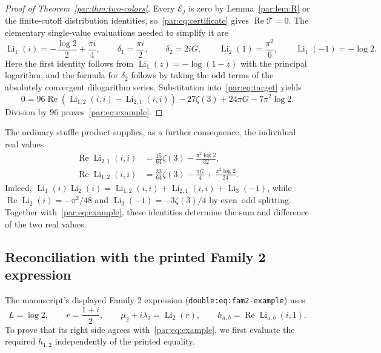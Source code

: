 \documentclass[11pt,a4paper]{article}
\numberwithin{equation}{section}
\theoremstyle{definition}
\theoremstyle{remark}
\DeclareMathOperator{\Li}{Li}
\newcommand{\src}[1]{\nolinkurl{#1}}
\begin{document}
\begin{proof}[Proof of Theorem~\ref{par:thm:two-colors}]
Every $\mathcal E_j$ is zero by Lemma~\ref{par:lem:R} or the finite-cutoff
distribution identities, so~\eqref{par:eq:certificate} gives
$\operatorname{Re}\mathcal T=0$.
The elementary single-value evaluations needed to simplify it are
\[
 \Li_1(i)=-\frac{\log2}{2}+\frac{\pi i}{4},\qquad
 \delta_1=\frac{\pi i}{2},\qquad
 \delta_2=2iG,\qquad
 \Li_2(1)=\frac{\pi^2}{6},\qquad
 \Li_1(-1)=-\log2.
\]
Here the first identity follows from $\Li_1(z)=-\log(1-z)$ with the
principal logarithm, and the formula for $\delta_2$ follows by taking the
odd terms of the absolutely convergent dilogarithm series.
Substitution into~\eqref{par:eq:target} yields
\[
 0=96\operatorname{Re}\!\left(\Li_{1,2}(i,i)-\Li_{2,1}(i,i)\right)
     -27\zeta(3)+24\pi G-7\pi^2\log2.
\]
Division by $96$ proves~\eqref{par:eq:example}.
\end{proof}

The ordinary stuffle product supplies, as a further consequence, the
individual real values
\begin{align}
 \operatorname{Re}\Li_{2,1}(i,i)
   &=\frac{15}{64}\zeta(3)-\frac{\pi^2\log2}{32},
   \label{par:eq:individual-21}\\
 \operatorname{Re}\Li_{1,2}(i,i)
   &=\frac{33}{64}\zeta(3)-\frac{\pi G}{4}
       +\frac{\pi^2\log2}{24}.
   \label{par:eq:individual-12}
\end{align}
Indeed, $\Li_1(i)\Li_2(i)=\Li_{1,2}(i,i)+\Li_{2,1}(i,i)+\Li_3(-1)$,
while $\operatorname{Re}\Li_2(i)=-\pi^2/48$ and
$\Li_3(-1)=-3\zeta(3)/4$ by even--odd splitting.
Together with~\eqref{par:eq:example}, these identities determine the sum
and difference of the two real values.

\subsection{Reconciliation with the printed Family 2 expression}
\label{par:sec:family2-bridge}

The manuscript's displayed Family 2 expression
(\src{double:eq:fam2-example}) uses
\[
 L=\log2,\qquad r=\frac{1+i}{2},\qquad
 \mu_2+i\lambda_2=\Li_2(r),\qquad
 h_{a,b}=\operatorname{Re}\Li_{a,b}(i,1).
\]
To prove that its right side agrees with~\eqref{par:eq:example}, we first
evaluate the required $h_{1,2}$ independently of the printed equality.
\end{document}
